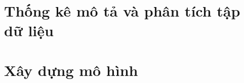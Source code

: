 \documentclass[14pt, a4paper]{article}
\theoremstyle{sltheorem}
\theoremstyle{soltheorem}
\begin{document}
            

            




    \section{Thống kê mô tả và phân tích tập dữ liệu}
    
    

    

    

    \section{Xây dựng mô hình}

    

    
    
    
    
    
    
    
    
    

    
    
    

    

    
\end{document}

